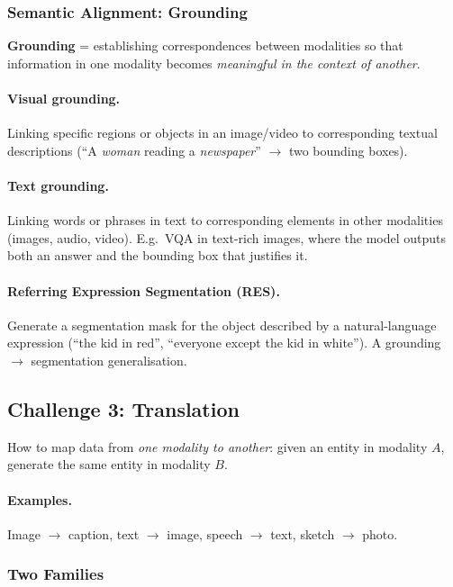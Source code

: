 \documentclass[11pt,a4paper]{article}
\theoremstyle{definition}
\theoremstyle{plain}
\theoremstyle{remark}
\begin{document}
\subsubsection{Semantic Alignment: Grounding}

\textbf{Grounding} = establishing correspondences between modalities so that information in one modality becomes \emph{meaningful in the context of another}.

\paragraph{Visual grounding.} Linking specific regions or objects in an image/video to corresponding textual descriptions (``A \emph{woman} reading a \emph{newspaper}'' $\to$ two bounding boxes).

\paragraph{Text grounding.} Linking words or phrases in text to corresponding elements in other modalities (images, audio, video). E.g.\ VQA in text-rich images, where the model outputs both an answer and the bounding box that justifies it.

\paragraph{Referring Expression Segmentation (RES).} Generate a segmentation mask for the object described by a natural-language expression (``the kid in red'', ``everyone except the kid in white''). A grounding $\to$ segmentation generalisation.

\subsection{Challenge 3: Translation}

How to map data from \emph{one modality to another}: given an entity in modality $A$, generate the same entity in modality $B$.

\paragraph{Examples.} Image $\to$ caption, text $\to$ image, speech $\to$ text, sketch $\to$ photo.

\subsubsection{Two Families}
\end{document}
